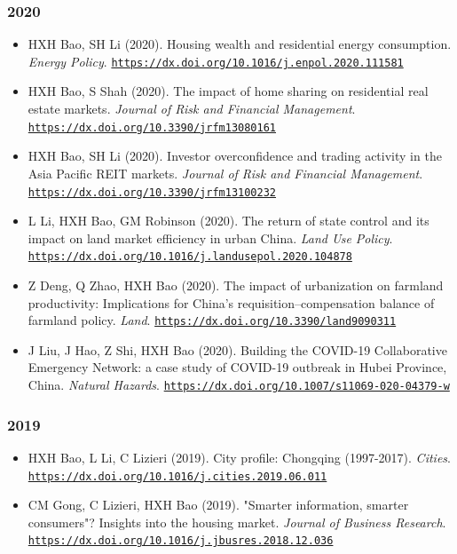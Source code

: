 \documentclass[11pt,a4paper]{article}
\providecommand{\tightlist}{%
  \setlength{\itemsep}{1pt}\setlength{\parskip}{0pt}}
\begin{document}
\subsubsection{2020}\label{section-6}

\begin{itemize}
\tightlist
\item
  HXH Bao, SH Li (2020). Housing wealth and residential energy
  consumption. \emph{Energy Policy}.
  \href{https://dx.doi.org/10.1016/j.enpol.2020.111581}{\nolinkurl{https://dx.doi.org/10.1016/j.enpol.2020.111581}}
\item
  HXH Bao, S Shah (2020). The impact of home sharing on residential real
  estate markets. \emph{Journal of Risk and Financial Management}.
  \href{https://dx.doi.org/10.3390/jrfm13080161}{\nolinkurl{https://dx.doi.org/10.3390/jrfm13080161}}
\item
  HXH Bao, SH Li (2020). Investor overconfidence and trading activity in
  the Asia Pacific REIT markets. \emph{Journal of Risk and Financial
  Management}.
  \href{https://dx.doi.org/10.3390/jrfm13100232}{\nolinkurl{https://dx.doi.org/10.3390/jrfm13100232}}
\item
  L Li, HXH Bao, GM Robinson (2020). The return of state control and its
  impact on land market efficiency in urban China. \emph{Land Use
  Policy}.
  \href{https://dx.doi.org/10.1016/j.landusepol.2020.104878}{\nolinkurl{https://dx.doi.org/10.1016/j.landusepol.2020.104878}}
\item
  Z Deng, Q Zhao, HXH Bao (2020). The impact of urbanization on farmland
  productivity: Implications for China's requisition--compensation
  balance of farmland policy. \emph{Land}.
  \href{https://dx.doi.org/10.3390/land9090311}{\nolinkurl{https://dx.doi.org/10.3390/land9090311}}
\item
  J Liu, J Hao, Z Shi, HXH Bao (2020). Building the COVID-19
  Collaborative Emergency Network: a case study of COVID-19 outbreak in
  Hubei Province, China. \emph{Natural Hazards}.
  \href{https://dx.doi.org/10.1007/s11069-020-04379-w}{\nolinkurl{https://dx.doi.org/10.1007/s11069-020-04379-w}}
\end{itemize}

\subsubsection{2019}\label{section-7}

\begin{itemize}
\tightlist
\item
  HXH Bao, L Li, C Lizieri (2019). City profile: Chongqing (1997-2017).
  \emph{Cities}.
  \href{https://dx.doi.org/10.1016/j.cities.2019.06.011}{\nolinkurl{https://dx.doi.org/10.1016/j.cities.2019.06.011}}
\item
  CM Gong, C Lizieri, HXH Bao (2019). "Smarter information, smarter
  consumers"? Insights into the housing market. \emph{Journal of
  Business Research}.
  \href{https://dx.doi.org/10.1016/j.jbusres.2018.12.036}{\nolinkurl{https://dx.doi.org/10.1016/j.jbusres.2018.12.036}}
\end{itemize}
\end{document}

